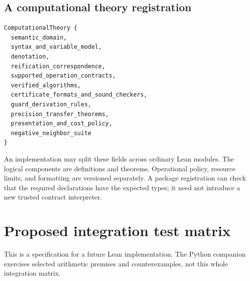 \documentclass[11pt,letterpaper]{article}
\theoremstyle{definition}
\theoremstyle{remark}
\begin{document}
\subsection{A computational theory registration}
\begin{lstlisting}
ComputationalTheory {
  semantic_domain,
  syntax_and_variable_model,
  denotation,
  reification_correspondence,
  supported_operation_contracts,
  verified_algorithms,
  certificate_formats_and_sound_checkers,
  guard_derivation_rules,
  precision_transfer_theorems,
  presentation_and_cost_policy,
  negative_neighbor_suite
}
\end{lstlisting}
An implementation may split these fields across ordinary Lean modules. The
logical components are definitions and theorems. Operational policy, resource
limits, and formatting are versioned separately. A package registration can
check that the required declarations have the expected types; it need not
introduce a new trusted contract interpreter.

\section{Proposed integration test matrix}
\label{app:tests}

This is a specification for a future Lean implementation. The Python companion
exercises selected arithmetic premises and counterexamples, not this whole
integration matrix.
\end{document}
